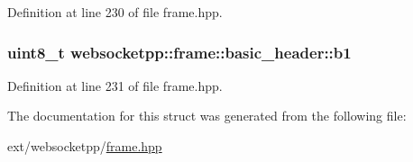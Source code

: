 Definition at line 230 of file frame.\+hpp.

\hypertarget{structwebsocketpp_1_1frame_1_1basic__header_a631a0cbf798d7996a4de1d62f03cc470}{}
\subsubsection[{b1}]{\setlength{\rightskip}{0pt plus 5cm}uint8\+\_\+t websocketpp\+::frame\+::basic\+\_\+header\+::b1}\label{structwebsocketpp_1_1frame_1_1basic__header_a631a0cbf798d7996a4de1d62f03cc470}


Definition at line 231 of file frame.\+hpp.



The documentation for this struct was generated from the following file\+:\begin{DoxyCompactItemize}
\item 
ext/websocketpp/\hyperlink{frame_8hpp}{frame.\+hpp}\end{DoxyCompactItemize}
